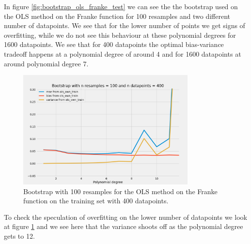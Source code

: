In figure \ref{fig:bootstrap_ols_franke_test} we can see the the bootstrap used on the OLS method on the Franke function for 100 resamples and two different number of datapoints. We see that for the lower number of points we get signs of overfitting, while we do not see this behaviour at these polynomial degrees for 1600 datapoints. We see that for 400 datapoints the optimal bias-variance tradeoff happens at a polynomial degree of around 4 and for 1600 datapoints at around polynomial degree 7.


    



\begin{figure}[H]
    \centering
    \includegraphics[width=0.8\textwidth]{Figures/c_bootstrap_ols_n_data_400_train_data.png}
    \caption{Bootstrap with 100 resamples for the OLS method on the Franke function on the training set with 400 datapoints.}
    \label{fig:bootstrap_ols_franke_train}
\end{figure}

To check the speculation of overfitting on the lower number of datapoints we look at figure \ref{fig:bootstrap_ols_franke_train} and we see here that the variance shoots off as the polynomial degree gets to 12. 



